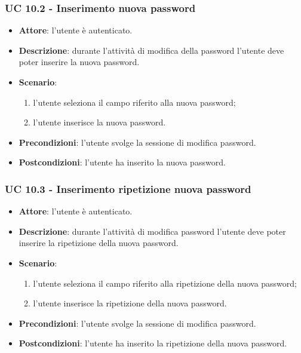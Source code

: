 \subsubsection{UC 10.2 - Inserimento nuova password}
\begin{itemize}
    \item \textbf{Attore}: l'utente è autenticato.
    \item \textbf{Descrizione}: durante l'attività di modifica della password l'utente deve poter inserire la nuova password.
    \item \textbf{Scenario}:
    \begin{enumerate}
        \item l'utente seleziona il campo riferito alla nuova password;
        \item l'utente inserisce la nuova password.
    \end{enumerate}

    \item \textbf{Precondizioni}: l'utente svolge la sessione di modifica password.
    \item \textbf{Postcondizioni}: l'utente ha inserito la nuova password.
\end{itemize}

\subsubsection{UC 10.3 - Inserimento ripetizione nuova password}
\begin{itemize}
    \item \textbf{Attore}: l'utente è autenticato.
    \item \textbf{Descrizione}: durante l'attività di modifica password l'utente deve poter inserire la ripetizione della nuova password.
    \item \textbf{Scenario}:
    \begin{enumerate}
        \item l'utente seleziona il campo riferito alla ripetizione della nuova password;
        \item l'utente inserisce la ripetizione della nuova password.
    \end{enumerate}

    \item \textbf{Precondizioni}: l'utente svolge la sessione di modifica password.
    \item \textbf{Postcondizioni}: l'utente ha inserito la ripetizione della nuova password.
\end{itemize}

